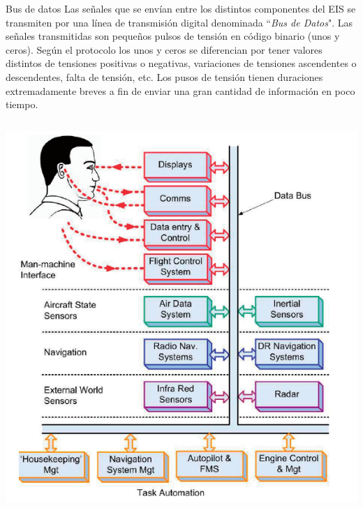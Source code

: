 \begin{frame}

  \begin{block}{Bus de datos}
{\small
    Las se\~nales que se env\'ian entre los distintos componentes del
    EIS se transmiten por una l\'inea de transmisi\'on digital
    denominada ``{\it Bus de Datos}". Las se\~nales transmitidas son
    peque\~nos pulsos de tensi\'on en c\'odigo binario (unos y
    ceros). Seg\'un el protocolo los unos y ceros se diferencian por
    tener valores distintos de tensiones positivas o negativas,
    variaciones de tensiones ascendentes o descendentes, falta de
    tensi\'on, etc. Los pusos de tensi\'on tienen duraciones
    extremadamente breves a fin de enviar una gran cantidad de
    informaci\'on en poco tiempo.
}
  \end{block}


  \begin{columns}
    \begin{column}{0.5\textwidth}
      \includegraphics[width=\linewidth]{imagenes/1.2.clasificacion.instrumentos/tipos_instrumentos.png}


\end{column}
\end{columns}
\end{frame}
